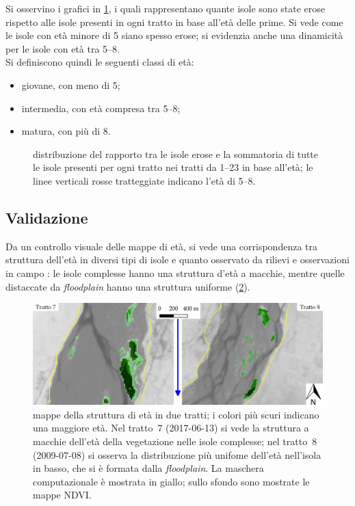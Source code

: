 \medskip
Si osservino i grafici in \cref{graph:distrib-rapp-eros-eta}, i quali rappresentano quante isole sono state erose rispetto alle isole presenti in ogni tratto in base all'età delle prime.
Si vede come le isole con età minore di \SI{5}{\anni} siano spesso erose; si evidenzia anche una dinamicità per le isole con età tra \SIrange[range-phrase={ e }]{5}{8}{\anni}. 
\\
Si definiscono quindi le seguenti classi di età:
%
\begin{itemize}
	\item giovane, con meno di \SI{5}{\anni};
	\item intermedia, con età compresa tra \SIrange[range-phrase={ e }]{5}{8}{\anni};
	\item matura, con più di \SI{8}{\anni}.
\end{itemize}
%
\begin{figure}
	\centering
	
	\caption[distribuzione del rapporto tra isole erose e la somma delle isole presenti]{distribuzione del rapporto tra le isole erose e la sommatoria di tutte le isole presenti per ogni tratto nei tratti da \numrange[range-phrase={ a }, mode=text]{1}{23} in base all'età; le linee verticali rosse tratteggiate indicano l'età di \SIrange[range-phrase={ e }]{5}{8}{\anni}.}
	\label{graph:distrib-rapp-eros-eta}
\end{figure}

\subsection{Validazione}
Da un controllo visuale delle mappe di età, si vede una corrispondenza tra struttura dell'età in diversi tipi di isole e quanto osservato da rilievi e osservazioni in campo : le isole complesse hanno una struttura d'età a macchie, mentre quelle distaccate da \emph{floodplain} hanno una struttura uniforme (\cref{fig:struttura-eta}).
%
\begin{figure}
	\centering
	\includegraphics[width = \textwidth]{files/struttura_eta.jpeg}
	\caption[mappe della struttura di età in due tratti]{mappe della struttura di età in due tratti; i colori più scuri indicano una maggiore età.
		Nel tratto~7 (2017-06-13) si vede la struttura a macchie dell'età della vegetazione nelle isole complesse;
		nel tratto~8 (2009-07-08) si osserva la distribuzione più unifome dell'età nell'isola in basso, che si è formata dalla \emph{floodplain}.
		La maschera computazionale è mostrata in giallo; sullo sfondo sono mostrate le mappe NDVI.}
	\label{fig:struttura-eta}
\end{figure}
%

